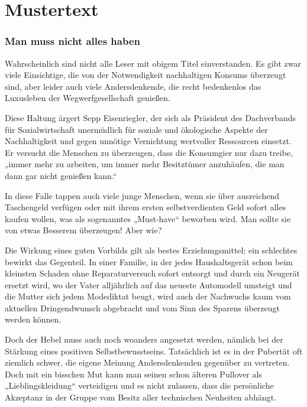 

\section{Mustertext}

\subsubsection{Man muss nicht alles haben}

Wahrscheinlich sind nicht alle Leser mit obigem Titel einverstanden. Es gibt zwar viele Einsichtige, die von der Notwendigkeit nachhaltigen Konsums überzeugt sind, aber leider auch viele Andersdenkende, die recht bedenkenlos das Luxusleben der Wegwerfgesellschaft genießen. 

Diese Haltung ärgert Sepp Eisenriegler, der sich als Präsident des Dachverbands für Sozialwirtschaft unermüdlich für soziale und ökologische Aspekte der Nachhaltigkeit und gegen unnötige Vernichtung wertvoller Ressourcen einsetzt. Er versucht die Menschen zu überzeugen, dass die Konsumgier nur dazu treibe, „immer mehr zu arbeiten, um immer mehr Besitztümer anzuhäufen, die man dann gar nicht genießen kann.“ 

 

In diese Falle tappen auch viele junge Menschen, wenn sie über ausreichend Taschengeld verfügen oder mit ihrem ersten selbstverdienten Geld sofort alles kaufen wollen, was als sogenanntes „Must-have“ beworben wird. Man sollte sie von etwas Besserem überzeugen! Aber wie? 

Die Wirkung eines guten Vorbilds gilt als bestes Erziehungsmittel; ein schlechtes bewirkt das Gegenteil. In einer Familie, in der jedes Haushaltsgerät schon beim kleinsten Schaden ohne Reparaturversuch sofort entsorgt und durch ein Neugerät ersetzt wird, wo der Vater alljährlich auf das neueste Automodell umsteigt und die Mutter sich jedem Modediktat beugt, wird auch der Nachwuchs kaum vom aktuellen Dringendwunsch abgebracht und vom Sinn des Sparens überzeugt werden können.  

Doch der Hebel muss auch noch woanders angesetzt werden, nämlich bei der Stärkung eines positiven Selbstbewusstseins. Tatsächlich ist es in der Pubertät oft ziemlich schwer, die eigene Meinung Andersdenkenden gegenüber zu vertreten. Doch mit ein bisschen Mut kann man seinen schon älteren Pullover als „Lieblingskleidung“ verteidigen und es nicht zulassen, dass die persönliche Akzeptanz in der Gruppe vom Besitz aller technischen Neuheiten abhängt. 

